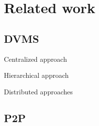 \section{Related work}

\subsection{DVMS}
Centralized approach~\cite{hermenier:cp11}

Hierarchical approach~\cite{feller:ccgrid12}

Distributed approaches~\cite{barbagallo:lncs10,feller:cloudcom12,marzolla:wowmom11,mastroianni:europar11,rouzaudcornabas:vhpc10,yazir:cloud10}

\subsection{P2P}

